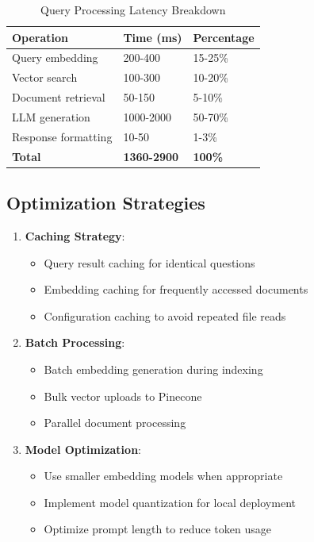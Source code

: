 \documentclass[12pt,a4paper]{article}
\begin{document}
\begin{table}[H]
\centering
\begin{tabular}{@{}lll@{}}
\toprule
\textbf{Operation} & \textbf{Time (ms)} & \textbf{Percentage} \\
\midrule
Query embedding & 200-400 & 15-25\% \\
Vector search & 100-300 & 10-20\% \\
Document retrieval & 50-150 & 5-10\% \\
LLM generation & 1000-2000 & 50-70\% \\
Response formatting & 10-50 & 1-3\% \\
\midrule
\textbf{Total} & \textbf{1360-2900} & \textbf{100\%} \\
\bottomrule
\end{tabular}
\caption{Query Processing Latency Breakdown}
\end{table}

\subsection{Optimization Strategies}

\begin{enumerate}
    \item \textbf{Caching Strategy}:
    \begin{itemize}
        \item Query result caching for identical questions
        \item Embedding caching for frequently accessed documents
        \item Configuration caching to avoid repeated file reads
    \end{itemize}
    
    \item \textbf{Batch Processing}:
    \begin{itemize}
        \item Batch embedding generation during indexing
        \item Bulk vector uploads to Pinecone
        \item Parallel document processing
    \end{itemize}
    
    \item \textbf{Model Optimization}:
    \begin{itemize}
        \item Use smaller embedding models when appropriate
        \item Implement model quantization for local deployment
        \item Optimize prompt length to reduce token usage
    \end{itemize}
\end{enumerate}
\end{document}
